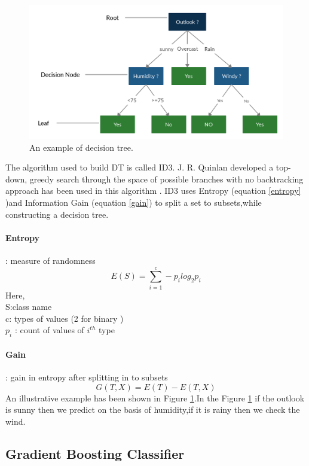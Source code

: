 \begin{figure}[ht]
    \centering
    \includegraphics[width=15cm]{Pictures/decision_tres_1.jpg}
    \caption{An example of decision tree.}
    \label{fig:decision_tree}
\end{figure}

The algorithm used to build  DT is called ID3.  J. R. Quinlan developed a top-down, greedy search through the space of possible branches with no backtracking approach has been used in this algorithm . ID3 uses Entropy (equation \ref{entropy} )and Information Gain (equation \ref{gain}) to split a set to subsets,while constructing  a decision tree.
\paragraph{Entropy} : measure of randomness
\begin{equation}
    E(S)=\sum_{i=1}^c -p_i log_2 p_i
    \label{entropy}
\end{equation}
Here,\\
S:class name\\
c: types of values (2 for binary ) \\
$p_i$ : count of values of $i^{th}$ type\\
\paragraph{Gain} : gain in entropy after splitting in to subsets
    \begin{equation}
        G(T,X) = E(T) - E(T,X)
        \label{gain}
    \end{equation}
An illustrative example has been shown in Figure \ref{fig:decision_tree}.In the Figure \ref{fig:decision_tree} if the outlook is sunny then we predict on the basis of  humidity,if it is rainy then we check the wind.   
\subsection{Gradient Boosting Classifier}

